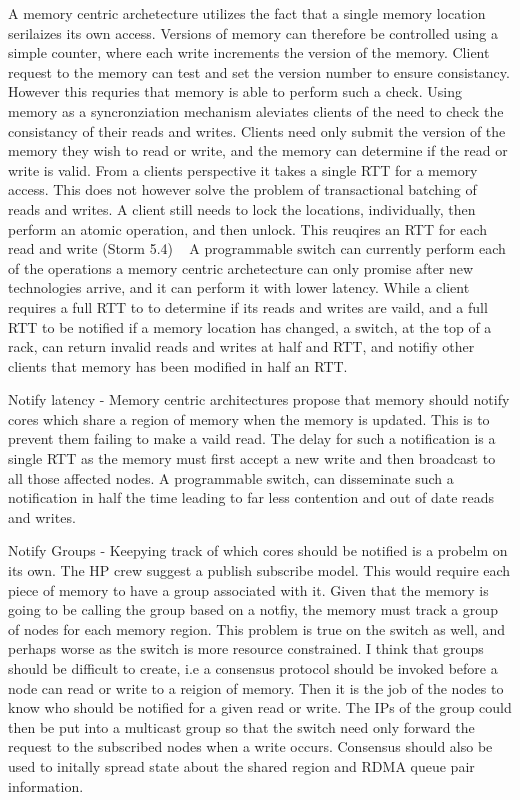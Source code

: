 A memory centric archetecture utilizes the fact that a single memory location
serilaizes its own access. Versions of memory can therefore be controlled
using a simple counter, where each write increments the version of the
memory. Client request to the memory can test and set the version number to
ensure consistancy. However this requries that memory is able to perform such
a check. Using memory as a syncronziation mechanism aleviates clients of the
need to check the consistancy of their reads and writes. Clients need only
submit the version of the memory they wish to read or write, and the memory
can determine if the read or write is valid. From a clients perspective it
takes a single RTT for a memory access. This does not however solve the
problem of transactional batching of reads and writes. A client still needs
to lock the locations, individually, then perform an atomic operation, and
then unlock. This reuqires an RTT for each read and write (Storm 5.4)
~\cite{storm} A programmable switch can currently perform each of the
operations a memory centric archetecture can only promise after new
technologies arrive, and it can perform it with lower latency. While a client
requires a full RTT to to determine if its reads and writes are vaild, and a
full RTT to be notified if a memory location has changed, a switch, at the
top of a rack, can return invalid reads and writes at half and RTT, and
notifiy other clients that memory has been modified in half an RTT.

Notify latency - Memory centric architectures propose that memory should
notify cores which share a region of memory when the memory is updated. This
is to prevent them failing to make a vaild read. The delay for such a
notification is a single RTT as the memory must first accept a new write and
then broadcast to all those affected nodes. A programmable switch, can
disseminate such a notification in half the time leading to far less
contention and out of date reads and writes.

Notify Groups - Keepying track of which cores should be notified is a probelm
on its own. The HP crew suggest a publish subscribe model. This would require
each piece of memory to have a group associated with it. Given that the
memory is going to be calling the group based on a notfiy, the memory must
track a group of nodes for each memory region. This problem is true on the
switch as well, and perhaps worse as the switch is more resource constrained.
I think that groups should be difficult to create, i.e a consensus protocol
should be invoked before a node can read or write to a reigion of memory.
Then it is the job of the nodes to know who should be notified for a given
read or write. The IPs of the group could then be put into a multicast group
so that the switch need only forward the request to the subscribed nodes when
a write occurs. Consensus should also be used to initally spread state about
the shared region and RDMA queue pair information.

